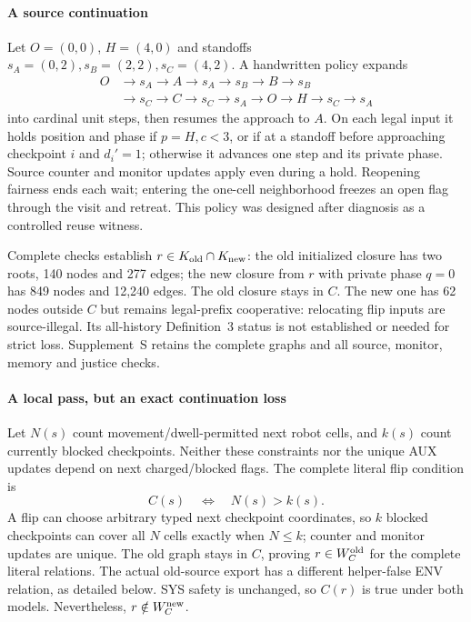 \paragraph{A source continuation}
Let $O=(0,0)$, $H=(4,0)$ and standoffs
$s_A=(0,2),s_B=(2,2),s_C=(4,2)$. A handwritten policy expands
\[
\begin{aligned}
O&\to s_A\to A\to s_A\to s_B\to B\to s_B\\
 &\to s_C\to C\to s_C\to s_A\to O\to H\to s_C\to s_A
\end{aligned}
\]
into cardinal unit steps, then resumes the approach to $A$.
On each legal input it holds position and phase if $p=H,c<3$, or
if at a standoff before approaching checkpoint $i$ and $d_i'=1$;
otherwise it advances one step and its private phase. Source counter and
monitor updates apply even during a hold. Reopening fairness ends each
wait; entering the one-cell neighborhood freezes an open flag through
the visit and retreat. This policy was designed after diagnosis as a
controlled reuse witness.

Complete checks establish $r\in K_{\rm old}\cap K_{\rm new}$: the old
initialized closure has two roots, 140 nodes and 277 edges; the new
closure from $r$ with private phase $q=0$ has 849 nodes and 12,240 edges. The old closure stays
in $C$. The new one has 62 nodes outside $C$ but remains legal-prefix
cooperative: relocating flip inputs are source-illegal. Its all-history
Definition~3 status is not established or needed for strict loss. Supplement~S retains the
complete graphs and all source, monitor, memory and justice checks.

\paragraph{A local pass, but an exact continuation loss}
Let $N(s)$ count movement/dwell-permitted next robot cells, and $k(s)$
count currently blocked checkpoints. Neither these constraints nor the
unique AUX updates depend on next charged/blocked flags. The complete
literal flip condition is
\[
 C(s)\quad\Longleftrightarrow\quad N(s)>k(s).
\]
A flip can choose arbitrary typed next checkpoint coordinates, so $k$
blocked checkpoints can cover all $N$ cells exactly when $N\le k$;
counter and monitor updates are unique. The old graph stays in $C$,
proving $r\in W_C^{\rm old}$ for the complete literal relations.
The actual old-source export has a different helper-false ENV relation,
as detailed below. SYS safety is unchanged, so $C(r)$ is true under both
models. Nevertheless, $r\notin W_C^{\rm new}$.

